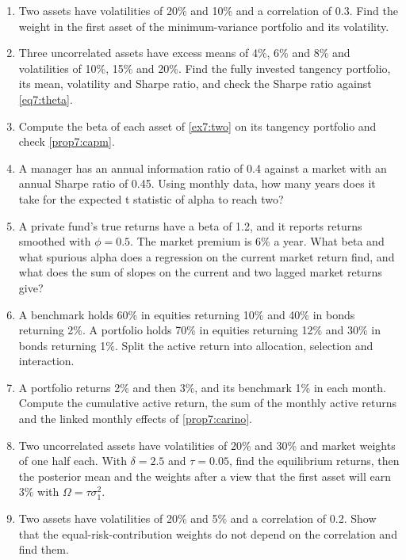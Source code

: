 \begin{chapterrefs}
\begin{enumerate}[label=\textbf{7.\arabic*}, leftmargin=*, ref=7.\arabic*]
  \item\label{ex7:one} Two assets have volatilities of 20\% and 10\% and a correlation of 0.3. Find
  the weight in the first asset of the minimum-variance portfolio and its volatility.
  \item\label{ex7:two} Three uncorrelated assets have excess means of 4\%, 6\% and 8\% and
  volatilities of 10\%, 15\% and 20\%. Find the fully invested tangency portfolio, its mean,
  volatility and Sharpe ratio, and check the Sharpe ratio against \cref{eq7:theta}.
  \item\label{ex7:three} Compute the beta of each asset of \cref{ex7:two} on its tangency portfolio and
  check \cref{prop7:capm}.
  \item\label{ex7:four} A manager has an annual information ratio of 0.4 against a market with an
  annual Sharpe ratio of 0.45. Using monthly data, how many years does it take for the expected t
  statistic of alpha to reach two?
  \item\label{ex7:five} A private fund's true returns have a beta of 1.2, and it reports returns
  smoothed with $\phi=0.5$. The market premium is 6\% a year. What beta and what spurious alpha does a
  regression on the current market return find, and what does the sum of slopes on the current and two
  lagged market returns give?
  \item\label{ex7:six} A benchmark holds 60\% in equities returning 10\% and 40\% in bonds returning 2\%.
  A portfolio holds 70\% in equities returning 12\% and 30\% in bonds returning 1\%. Split the active
  return into allocation, selection and interaction.
  \item\label{ex7:seven} A portfolio returns 2\% and then 3\%, and its benchmark 1\% in each month.
  Compute the cumulative active return, the sum of the monthly active returns and the linked monthly
  effects of \cref{prop7:carino}.
  \item\label{ex7:eight} Two uncorrelated assets have volatilities of 20\% and 30\% and market weights
  of one half each. With $\delta=2.5$ and $\tau=0.05$, find the equilibrium returns, then the posterior
  mean and the weights after a view that the first asset will earn 3\% with $\Omega=\tau\sigma_1^2$.
  \item\label{ex7:nine} Two assets have volatilities of 20\% and 5\% and a correlation of 0.2. Show that
  the equal-risk-contribution weights do not depend on the correlation and find them.
\end{enumerate}


\end{chapterrefs}
